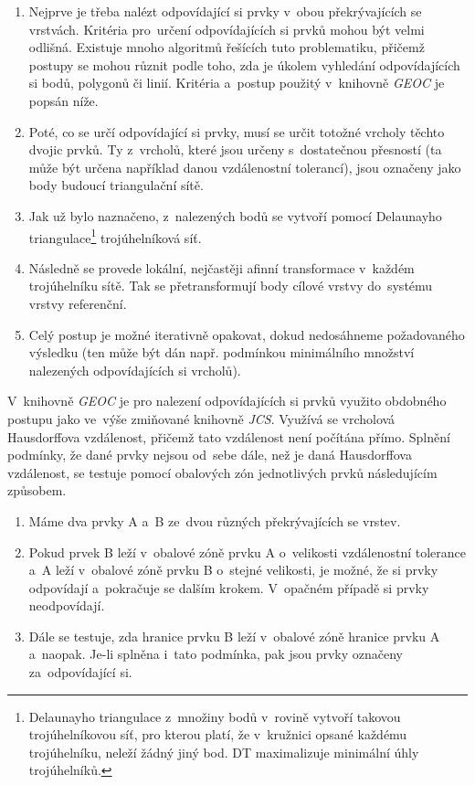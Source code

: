 \begin{enumerate}[leftmargin=*]
 \item Nejprve je třeba nalézt odpovídající si prvky v~obou překrývajících se 
    vrstvách. Kritéria pro~určení odpovídajících si prvků mohou být velmi 
    odlišná. Existuje mnoho algoritmů řešících tuto problematiku, přičemž 
    postupy se mohou různit podle toho, zda je úkolem vyhledání 
    odpovídajících si bodů, polygonů či linií. Kritéria a~postup použitý 
    v~knihovně \textit{GEOC} je popsán níže.
 \item Poté, co se určí odpovídající si prvky, musí se určit totožné vrcholy 
    těchto dvojic prvků. Ty z~vrcholů, které jsou určeny s~dostatečnou 
    přesností (ta může být určena například danou vzdálenostní tolerancí), 
    jsou označeny jako body budoucí triangulační sítě.
 \item Jak už bylo naznačeno, z~nalezených bodů se vytvoří pomocí Delaunayho 
    triangulace\footnote{Delaunayho triangulace z~množiny bodů v~rovině vytvoří takovou 
    trojúhelníkovou síť, pro kterou platí, že v~kružnici opsané každému
    trojúhelníku, neleží žádný jiný bod. DT maximalizuje
    minimální úhly trojúhelníků.} trojúhelníková síť. 
 \item Následně se provede lokální, nejčastěji afinní transformace v~každém 
    trojúhelníku sítě. Tak se přetransformují body cílové vrstvy do~systému 
    vrstvy referenční.
 \item Celý postup je možné iterativně opakovat, dokud nedosáhneme 
    požadovaného výsledku (ten může být dán např. podmínkou minimálního 
    množství nalezených odpovídajících si vrcholů).
\end{enumerate}

V~knihovně \textit{GEOC} je pro nalezení odpovídajících si prvků využito 
obdobného postupu jako ve~výše zmiňované knihovně \textit{JCS}. Využívá 
se vrcholová Hausdorffova vzdálenost, přičemž tato vzdálenost není počítána 
přímo. Splnění podmínky, že dané prvky nejsou od~sebe dále, než je daná 
Hausdorffova vzdálenost, se testuje pomocí obalových zón jednotlivých prvků 
následujícím způsobem.

\begin{enumerate}[leftmargin=*]
 \item Máme dva prvky A a~B ze~dvou různých překrývajících se vrstev.
 \item Pokud prvek B leží v~obalové zóně prvku A o~velikosti vzdálenostní 
    tolerance a~A leží v~obalové zóně prvku B o~stejné velikosti, je možné, 
    že si prvky odpovídají a~pokračuje se dalším krokem. V~opačném případě 
    si prvky neodpovídají.
 \item Dále se testuje, zda hranice prvku B leží v~obalové zóně hranice prvku
    A a~naopak. Je-li splněna i~tato podmínka, pak jsou prvky označeny 
    za~odpovídající si.
\end{enumerate}

